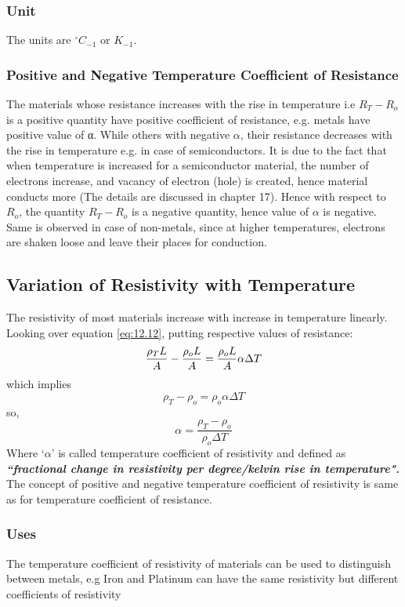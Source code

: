 \subsubsection{Unit}
The units are $^{\circ}C_{-1}$ or $K_{-1}$.
\subsubsection{Positive and Negative Temperature Coefficient of Resistance}
The materials whose resistance increases with the rise in temperature i.e
$R_{T}-R_{o}$ is a positive quantity have positive coefficient of resistance,
e.g. metals have positive value of α. While others with negative $\alpha$,
their resistance decreases with the rise in temperature e.g. in case of
semiconductors. It is due to the fact that when temperature is increased
for a semiconductor material, the number of electrons increase,
and vacancy of electron (hole) is created, hence material conducts more
(The details are discussed in chapter 17). Hence with respect to $R_{o}$,
the quantity $R_{T}-R_{o}$ is a negative quantity, hence value of $\alpha$
is negative. Same is observed in case of non-metals, since at higher
temperatures, electrons are shaken loose and leave their places for
conduction.
\subsection{Variation of Resistivity with Temperature}
The resistivity of most materials increase with increase in temperature
linearly. Looking over equation \ref{eq:12.12}, putting respective values
of resistance:
\begin{equation}\notag
\frac{\rho_{T}L}{A} - \frac{\rho_{o}L}{A} = \frac{\rho_{o}L}{A}\alpha\Delta T
\end{equation}
which implies
\begin{equation}\nonumber
\rho_{T}-\rho_{o} = \rho_{o} \alpha  \Delta T    
\end{equation}
so,
\begin{equation}
    \alpha = \frac{\rho_{T} - \rho_{o}}{\rho_{o}\Delta T}
\end{equation}
Where `$\alpha$' is called temperature coefficient of resistivity and defined as \textit{\textbf{``fractional change in resistivity per degree/kelvin rise in temperature".}}
The concept of positive and negative temperature coefficient of resistivity is same as for temperature coefficient of resistance.
\subsubsection{Uses}
The temperature coefficient of resistivity of materials can be used to distinguish between metals, e.g Iron and Platinum can have the same resistivity but different coefficients of resistivity
